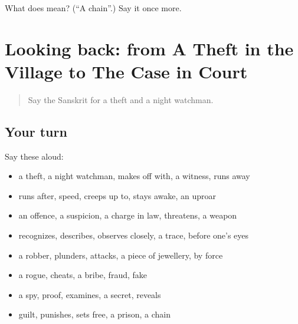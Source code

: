 \begin{tcolorbox}[breakable,colback=teal!4,colframe=teal!35!black,title={Before you move on}]
What does  mean? (\textquotedblleft{}A chain\textquotedblright{}.) Say it once more.
\end{tcolorbox}
\section[(dialogue)]{Looking back: from A Theft in the Village to The Case in Court}

\label{lesson:SA-R293-review-286-293}



\begin{quote}
Say the Sanskrit for a theft and a night watchman.
\end{quote}

\subsection*{Your turn}
Say these aloud:

\begin{itemize}
\raggedright
  \item a theft, a night watchman, makes off with, a witness, runs away
  \item runs after, speed, creeps up to, stays awake, an uproar
  \item an offence, a suspicion, a charge in law, threatens, a weapon
  \item recognizes, describes, observes closely, a trace, before one's eyes
  \item a robber, plunders, attacks, a piece of jewellery, by force
  \item a rogue, cheats, a bribe, fraud, fake
  \item a spy, proof, examines, a secret, reveals
  \item guilt, punishes, sets free, a prison, a chain
\end{itemize}

